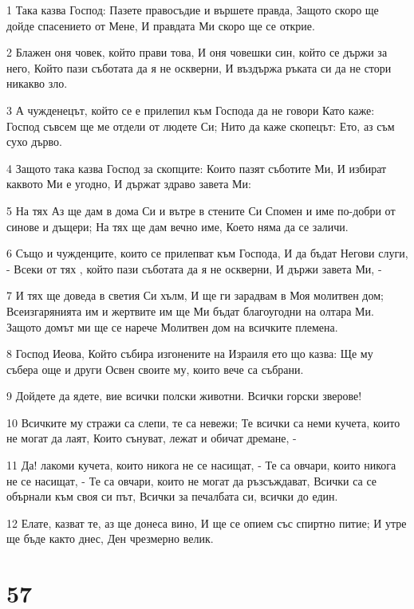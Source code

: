 \par 1 Така казва Господ: Пазете правосъдие и вършете правда, Защото скоро ще дойде спасението от Мене, И правдата Ми скоро ще се открие.
\par 2 Блажен оня човек, който прави това, И оня човешки син, който се държи за него, Който пази съботата да я не оскверни, И въздържа ръката си да не стори никакво зло.
\par 3 А чужденецът, който се е прилепил към Господа да не говори Като каже: Господ съвсем ще ме отдели от людете Си; Нито да каже скопецът: Ето, аз съм сухо дърво.
\par 4 Защото така казва Господ за скопците: Които пазят съботите Ми, И избират каквото Ми е угодно, И държат здраво завета Ми:
\par 5 На тях Аз ще дам в дома Си и вътре в стените Си Спомен и име по-добри от синове и дъщери; На тях ще дам вечно име, Което няма да се заличи.
\par 6 Също и чужденците, които се прилепват към Господа, И да бъдат Негови слуги, - Всеки от тях , който пази съботата да я не оскверни, И държи завета Ми, -
\par 7 И тях ще доведа в светия Си хълм, И ще ги зарадвам в Моя молитвен дом; Всеизгарянията им и жертвите им ще Ми бъдат благоугодни на олтара Ми. Защото домът ми ще се нарече Молитвен дом на всичките племена.
\par 8 Господ Иеова, Който събира изгонените на Израиля ето що казва: Ще му събера още и други Освен своите му, които вече са събрани.
\par 9 Дойдете да ядете, вие всички полски животни. Всички горски зверове!
\par 10 Всичките му стражи са слепи, те са невежи; Те всички са неми кучета, които не могат да лаят, Които сънуват, лежат и обичат дремане, -
\par 11 Да! лакоми кучета, които никога не се насищат, - Те са овчари, които никога не се насищат, - Те са овчари, които не могат да ръзсъждават, Всички са се обърнали към своя си път, Всички за печалбата си, всички до един.
\par 12 Елате, казват те, аз ще донеса вино, И ще се опием със спиртно питие; И утре ще бъде както днес, Ден чрезмерно велик.

\chapter{57}


